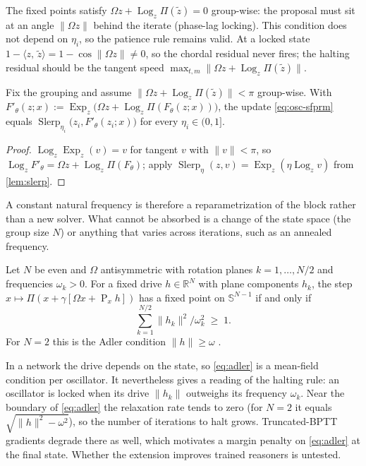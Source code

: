 \documentclass{article}
\theoremstyle{plain}
\theoremstyle{definition}
\theoremstyle{remark}
\newcommand{\R}{\mathbb{R}}
\newcommand{\Sph}{\mathbb{S}}
\newcommand{\ip}[2]{\langle #1,\, #2\rangle}
\newcommand{\norm}[1]{\lVert #1\rVert}
\newcommand{\Proj}{\operatorname{P}}
\newcommand{\Ret}{\Pi}
\newcommand{\Slerp}{\operatorname{Slerp}}
\newcommand{\Exp}{\operatorname{Exp}}
\newcommand{\Log}{\operatorname{Log}}
\begin{document}
The fixed points satisfy $\Omega z+\Log_z\Ret(\tilde z)=0$ group-wise: the proposal must sit at an
angle $\norm{\Omega z}$ behind the iterate (phase-lag locking). This condition does not depend on
$\eta_i$, so the patience rule remains valid. At a locked state
$1-\ip{z}{\tilde z}=1-\cos\norm{\Omega z}\neq0$, so the chordal residual never fires; the halting
residual should be the tangent speed $\max_{t,m}\norm{\Omega z+\Log_z\Ret(\tilde z)}$.

\begin{proposition}
\label{prop:absorb}
Fix the grouping and assume $\norm{\Omega z+\Log_z\Ret(\tilde z)}<\pi$ group-wise. With
$F'_\theta(z;x):=\Exp_z\big(\Omega z+\Log_z\Ret(F_\theta(z;x))\big)$, the update
\eqref{eq:osc-sfprm} equals $\Slerp_{\eta_i}\big(z_i,F'_\theta(z_i;x)\big)$ for every
$\eta_i\in(0,1]$.
\end{proposition}
\begin{proof}
$\Log_z\Exp_z(v)=v$ for tangent $v$ with $\norm{v}<\pi$, so $\Log_zF'_\theta=\Omega z+\Log_z\Ret(F_\theta)$;
apply $\Slerp_\eta(z,v)=\Exp_z(\eta\Log_zv)$ from \cref{lem:slerp}.
\end{proof}

A constant natural frequency is therefore a reparametrization of the block rather than a new solver.
What cannot be absorbed is a change of the state space (the group size $N$) or anything that varies
across iterations, such as an annealed frequency.

\begin{proposition}
\label{prop:adler}
Let $N$ be even and $\Omega$ antisymmetric with rotation planes $k=1,\dots,N/2$ and frequencies
$\omega_k>0$. For a fixed drive $h\in\R^N$ with plane components $h_k$, the step
$x\mapsto\Ret(x+\gamma[\Omega x+\Proj_x h])$ has a fixed point on $\Sph^{N-1}$ if and only if
\begin{equation}
  \textstyle\sum_{k=1}^{N/2}\norm{h_k}^2/\omega_k^2\;\ge\;1.
  \label{eq:adler}
\end{equation}
For $N=2$ this is the Adler condition $\norm{h}\ge\omega$ \citep{adler1946locking}.
\end{proposition}

In a network the drive depends on the state, so \eqref{eq:adler} is a mean-field condition per
oscillator. It nevertheless gives a reading of the halting rule: an oscillator is locked when its
drive $\norm{h_k}$ outweighs its frequency $\omega_k$. Near the boundary of \eqref{eq:adler} the
relaxation rate tends to zero (for $N=2$ it equals $\sqrt{\norm{h}^2-\omega^2}$), so the number of
iterations to halt grows. Truncated-BPTT gradients degrade there as well, which motivates a margin
penalty on \eqref{eq:adler} at the final state. Whether the extension improves trained reasoners is
untested.
\end{document}
